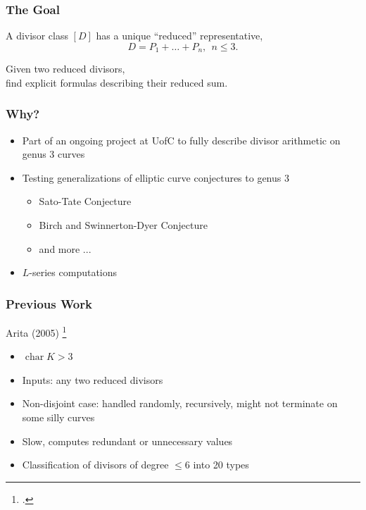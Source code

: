 \documentclass{beamer}
\DeclareMathOperator{\Char}{char}
\begin{document}

\begin{frame}
\frametitle{The Goal}
  \begin{center}
    A divisor class $[D]$ has a unique ``reduced'' representative,
    \[ D = P_1 + \ldots + P_n, ~~ n \leq 3. \]
  \end{center}
  \vspace{10pt}
  \begin{center}
    Given two reduced divisors,\\
    find explicit formulas describing their reduced sum.
  \end{center}
\end{frame}


\begin{frame}
\frametitle{Why?}
  \begin{itemize}
    \item Part of an ongoing project at UofC to fully describe divisor arithmetic on genus 3 curves
    \item Testing generalizations of elliptic curve conjectures to genus 3
    \begin{itemize}
      \item Sato-Tate Conjecture
      \item Birch and Swinnerton-Dyer Conjecture
      \item and more ...
    \end{itemize}
    \item $L$-series computations
  \end{itemize}
\end{frame}


\begin{frame}
\frametitle{Previous Work}
  Arita (2005) \footcite{arita05-2}
  \begin{itemize}
    \item $\Char K > 3$
    \item Inputs: any two reduced divisors
    \item Non-disjoint case: handled randomly, recursively, might not terminate on some silly curves
    \item Slow, computes redundant or unnecessary values
    \item Classification of divisors of degree $\leq 6$ into 20 types
  \end{itemize}
\end{frame}
\end{document}
